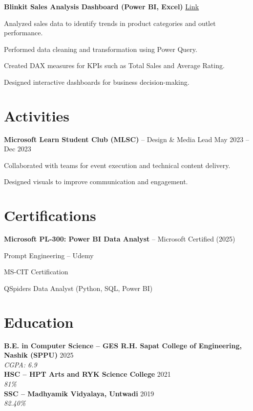 \documentclass[letterpaper,10pt]{article}
\newenvironment{resume_list}{
  \vspace{-4pt}
  \begin{itemize}[leftmargin=18pt, itemsep=-3pt]
}{
  \end{itemize}
}
\begin{document}
\textbf{Blinkit Sales Analysis Dashboard (Power BI, Excel)} 
\hfill \href{https://github.com/Krishna101211/Blinkit-sales-analysis-/blob/main/Blinkit.pdf}{Link}
\begin{resume_list}
  \item Analyzed sales data to identify trends in product categories and outlet performance.
  \item Performed data cleaning and transformation using Power Query.
  \item Created DAX measures for KPIs such as Total Sales and Average Rating.
  \item Designed interactive dashboards for business decision-making.
\end{resume_list}


\section*{Activities}
\textbf{Microsoft Learn Student Club (MLSC)} – Design \& Media Lead \hfill May 2023 -- Dec 2023
\begin{resume_list}
  \item Collaborated with teams for event execution and technical content delivery.
  \item Designed visuals to improve communication and engagement.
\end{resume_list}


\section*{Certifications}
\begin{resume_list}
  \item \textbf{Microsoft PL-300: Power BI Data Analyst} – Microsoft Certified (2025)
  \item Prompt Engineering – Udemy
  \item MS-CIT Certification
  \item QSpiders Data Analyst (Python, SQL, Power BI)
\end{resume_list}


\section*{Education}

\textbf{B.E. in Computer Science – GES R.H. Sapat College of Engineering, Nashik (SPPU)} \hfill 2025 \\
\textit{CGPA: 6.9} \\[-2pt]

\textbf{HSC – HPT Arts and RYK Science College} \hfill 2021 \\
\textit{81\%} \\[-2pt]

\textbf{SSC – Madhyamik Vidyalaya, Untwadi} \hfill 2019 \\
\textit{82.40\%}
\end{document}

